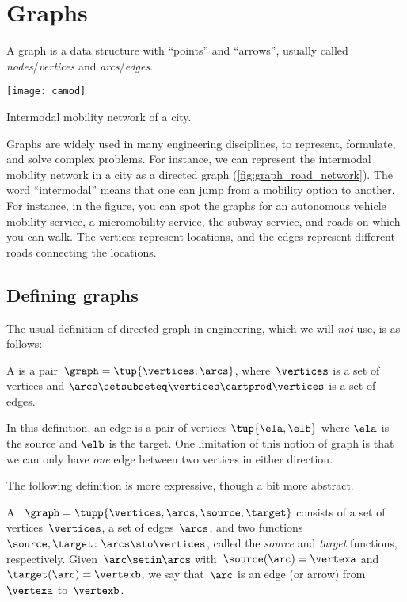 
\section{Graphs}

A graph is a data structure with ``points'' and ``arrows'', usually called \emph{no\-des}/\emph{ver\-tices} and \emph{arcs}/\emph{edges}.

\begin{marginfigure}
    \texttt{[image: camod]}
    \caption{Intermodal mobility network of a city.}
    \label{fig:graph_road_network}
\end{marginfigure}

Graphs are widely used in many engineering disciplines, to represent, formulate, and solve complex problems.
For instance, we can represent the intermodal mobility network in a city as a directed graph (\cref{fig:graph_road_network}).
The word ``intermodal'' means that one can jump from a mobility option to another.
For instance, in the figure, you can spot the graphs for an autonomous vehicle mobility service, a micromobility service, the subway service, and roads on which you can walk.
The vertices represent locations, and the edges represent different roads connecting the locations.

\subsection{Defining graphs}

The usual definition of directed graph in engineering, which we will \emph{not} use, is as follows:

\begin{definition}
    \label{def:directed-graph}
    A  is a pair~$\graph=\tup{\vertices, \arcs}$, where~$\vertices$ is
    a set of vertices and $\arcs \setsubseteq \vertices \cartprod \vertices$ is a set of edges.
\end{definition}
In this definition, an edge is a pair of vertices $\tup{\ela,\elb}$ where $\ela$ is the source and $\elb$ is the target.
One limitation of this notion of graph is that we can only have \emph{one} edge between two vertices in either direction.

The following definition is more expressive, though a bit more abstract.

\begin{definition}
    \label{def:Graph}
    A ~$\graph=\tupp{\vertices,\arcs, \source,\target}$ consists of a set of vertices~$\vertices$, a set of edges~$\arcs$, and two functions~$\source,\target \colon \arcs \sto \vertices$, called the \emph{source} and \emph{target} functions, respectively.
    Given~$\arc\setin \arcs$ with~$\source(\arc)=\vertexa$ and~$\target(\arc)=\vertexb$, we say that~$\arc$ is an edge (or arrow) from~$\vertexa$ to~$\vertexb$.
\end{definition}

